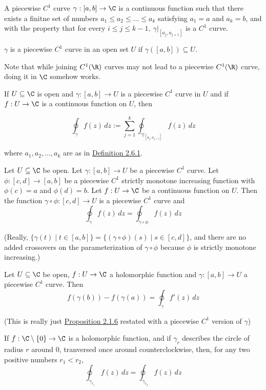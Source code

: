 A piecewise $C^1$ curve $\gamma:[a,b]\to\C$ is a continuous function
such that there exists a finitne set of numbers $a_1\leq
	a_2\leq\ldots\leq a_k$ satisfying $a_1=a$ and $a_k=b$, and with the
property that for every $i\leq j\leq k-1,\ \gamma|_{[a_j,a_{j+1}]}$ is
a $C^1$ curve.

$\gamma$ is a piecewise $C^1$ curve in an open set $U$ if
$\gamma([a,b])\subseteq U$.

Note that while joining $C^1(\R)$ curves may not lead to a piecewise
$C^1(\R)$ curve, doing it in $\C$ somehow works.

\label{a99ad34}

If $U\subseteq\C$ is open and $\gamma:[a,b]\to U$ is a piecewise $C^1$
curve in $U$ and if $f:U\to\C$ is a continuous function on $U$, then

$$
	\oint_\gamma f(z)\,dz:=\sum_{j=1}^k\oint_{\gamma|_{[a_j,a_{j+1}]}}
	f(z)\,dz
$$

where $a_1,a_2,\ldots,a_k$ are as in \href{baf22ac}{Definition 2.6.1}.

\label{b6b6d51}

Let $U\subseteq\C$ be open. Let $\gamma:[a,b]\to U$ be a piecewise
$C^1$ curve. Let $\phi:[c,d]\to[a,b]$ be a piecewise $C^1$ strictly
monotone increasing function with $\phi(c)=a$ and $\phi(d)=b$. Let
$f:U\to\C$ be a continuous function on $U$. Then the function
$\gamma\circ\phi:[c,d]\to U$ is a piecewise $C^1$ curve and
$$\oint_\gamma f(z)\,dz=\oint_{\gamma\circ\phi}f(z)\,dz$$

(Really, $\{\gamma(t)\mid t\in[a,b]\}=\{(\gamma\circ\phi)(s)\mid s
	\in[c,d]\}$, and there are no added crossovers on the parameterization
of $\gamma\circ\phi$ because $\phi$ is strictly monotone increasing.)

\label{cd28a8f}

Let $U\subseteq\C$ be open, $f:U\to\C$ a holomorphic function and
$\gamma:[a,b]\to U$ a piecewise $C^1$ curve. Then
$$
	f(\gamma(b))-f(\gamma(a))=\oint_\gamma f'(z)\,dz
$$

(This is really just \href{c526c09}{Proposition 2.1.6} restated
with a piecewise $C^1$ version of $\gamma$)

\label{b52bca5}

If $f:\C\setminus\{0\}\to\C$ is a holomorphic function, and if
$\gamma_r$ describes the circle of radius $r$ around $0$, tranversed
once around counterclockwise, then, for any two positive numbers
$r_1<r_2$,
$$
	\oint_{\gamma_{r_1}}f(z)\,dz=\oint_{\gamma_{r_2}}f(z)\,dz
$$

